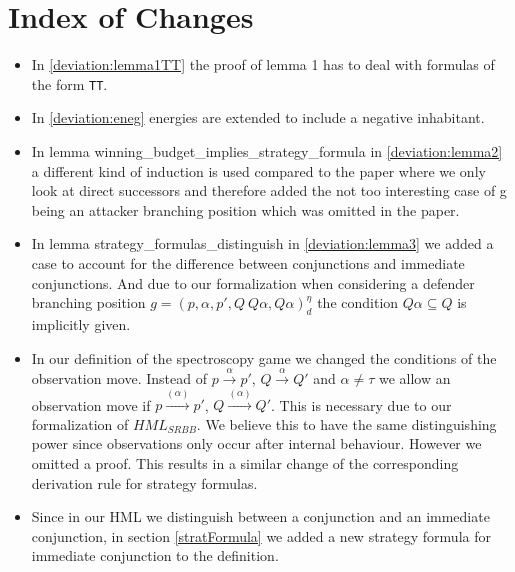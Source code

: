 \section{Index of Changes}
\begin{itemize}
    \item In \ref{deviation:lemma1TT} the proof of lemma 1 has to deal with formulas of the form \texttt{TT}. 
    \item In \ref{deviation:eneg} energies are extended to include a negative inhabitant. 
    \item In lemma winning\_budget\_implies\_strategy\_formula in \ref{deviation:lemma2} a different kind of induction is used compared to the paper 
    where we only look at direct successors and therefore added the not too interesting case of g being an 
    attacker branching position which was omitted in the paper.
    \item In lemma strategy\_formulas\_distinguish in  \ref{deviation:lemma3} we added a case to account for the difference between 
    conjunctions and immediate conjunctions. And due to our formalization when considering a
    defender branching position $g=(p,\alpha ,p', Q \ Q\alpha, Q\alpha)_d^\eta$ the condition 
    $Q \alpha \subseteq Q$ is implicitly given.
    \item In our definition of the spectroscopy game we changed the conditions of the observation move. 
    Instead of $p \overset{\alpha}{\longrightarrow}p'$, $Q \overset{\alpha}{\longrightarrow} Q'$ and $\alpha \neq \tau$
    we allow an observation move if  $p \overset{(\alpha)}{\longrightarrow}p'$, $Q \overset{(\alpha)}{\longrightarrow} Q'$.
    This is necessary due to our formalization of $HML_{SRBB}$. We believe this to have the same distinguishing power 
    since observations only occur after internal behaviour. However we omitted a proof. 
    This results in a similar change of the corresponding derivation rule for strategy formulas.
    \item Since in our HML we distinguish between a conjunction and an immediate conjunction, in section \ref{stratFormula} 
we added a new strategy formula for immediate conjunction to the definition.
\end{itemize}
